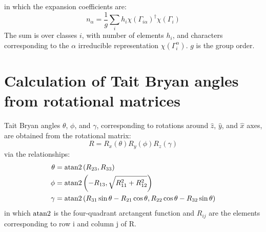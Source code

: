 \documentclass[preprint,showpacs,preprintnumbers,superscriptaddress,prb,floatfix,aps]{revtex4-1}
\begin{document}
in which the expansion coefficients are:
\begin{equation}
\label{eq:irrep_decomposition_coefficients}
n_\alpha = \frac{1}{g} \sum_i h_i \chi\left(\Gamma_{i\alpha}\right)^\dag \chi\left(\Gamma_i\right)
\end{equation}
The sum is over classes $i$, with number of elements $h_i$, and characters corresponding to the $\alpha$ irreducible representation $\chi(\Gamma_i^\alpha)$. $g$ is the group order.





\section{Calculation of Tait Bryan angles from rotational matrices}
Tait Bryan angles $\theta$, $\phi$, and $\gamma$, corresponding to rotations around $\hat{z}$, $\hat{y}$, and $\hat{x}$ axes, are obtained from the rotational matrix:
\begin{equation}
\label{eq:rotation}
R = R_x(\theta)R_y(\phi)R_z(\gamma)
\end{equation}
via the relationships:
\begin{align}
\label{eq:tait_bryan_angles}
\theta & = {\rm atan2}\left(R_{23},R_{33}\right) \\
\phi   & = {\rm atan2}\left(-R_{13},\sqrt{R_{11}^2+R_{12}^2}\right) \\
\gamma & = {\rm atan2}\left(R_{31}\sin{\theta}-R_{21}\cos{\theta},R_{22}\cos{\theta}-R_{32}\sin{\theta}\right)
\end{align}
in which ${\rm atan2}$ is the four-quadrant arctangent function and $R_{ij}$ are the elements corresponding to row i and column j of R. 
\end{document}
